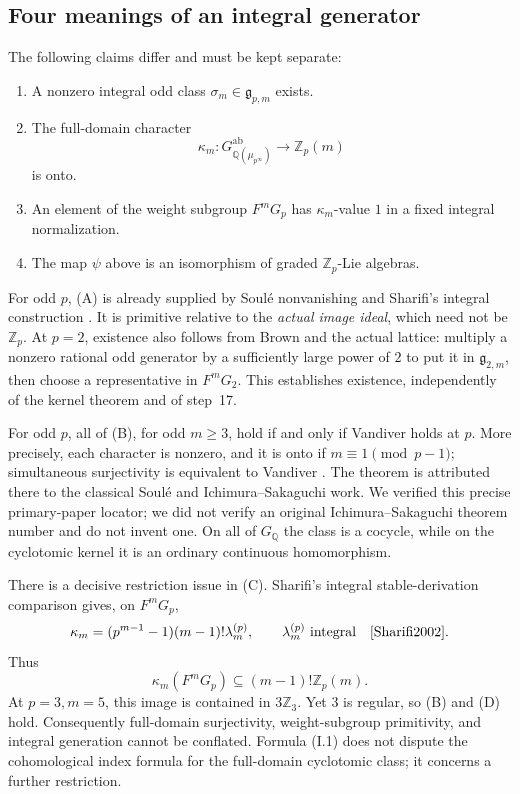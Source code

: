 \subsection{Four meanings of an integral generator}
\label{sec:four-integral-meanings}

The following claims differ and must be kept separate:
\begin{enumerate}
\item[(A)] A nonzero integral odd class $\sigma_m\in\mathfrak g_{p,m}$ exists.
\item[(B)] The full-domain character
\[
 \kappa_m:G_{\mathbb Q(\mu_{p^\infty})}^{\mathrm{ab}}
       \longrightarrow\mathbb Z_p(m)
\]
is onto.
\item[(C)] An element of the weight subgroup $F^mG_p$ has $\kappa_m$-value $1$ in a fixed integral normalization.
\item[(D)] The map $\psi$ above is an isomorphism of graded $\mathbb Z_p$-Lie algebras.
\end{enumerate}

For odd $p$, (A) is already supplied by Soul\'e nonvanishing and Sharifi's integral construction \cite[Proposition~2.3, pp.~5--6]{Sharifi2002}. It is primitive relative to the \emph{actual image ideal}, which need not be $\mathbb Z_p$. At $p=2$, existence also follows from Brown and the actual lattice: multiply a nonzero rational odd generator by a sufficiently large power of $2$ to put it in $\mathfrak g_{2,m}$, then choose a representative in $F^mG_2$. This establishes existence, independently of the kernel theorem and of step~17.

For odd $p$, all of (B), for odd $m\geq3$, hold if and only if Vandiver holds at $p$. More precisely, each character is nonzero, and it is onto if $m\equiv1\pmod{p-1}$; simultaneous surjectivity is equivalent to Vandiver \cite[Theorem~1.1(1)--(3), p.~2]{IshiiKummer2024}. The theorem is attributed there to the classical Soul\'e and Ichimura--Sakaguchi work. We verified this precise primary-paper locator; we did not verify an original Ichimura--Sakaguchi theorem number and do not invent one. On all of $G_{\mathbb Q}$ the class is a cocycle, while on the cyclotomic kernel it is an ordinary continuous homomorphism.

There is a decisive restriction issue in (C). Sharifi's integral stable-derivation comparison gives, on $F^mG_p$,
\[
 \kappa_m=(p^{m-1}-1)(m-1)!\lambda_m^{(p)},
 \qquad \lambda_m^{(p)}\text{ integral}
 \quad\cite[(2.10), p.~7]{Sharifi2002}.
\]
Thus
\[
 \kappa_m(F^mG_p)\subseteq(m-1)!\mathbb Z_p(m).              \tag{I.1}
\]
At $p=3,m=5$, this image is contained in $3\mathbb Z_3$. Yet $3$ is regular, so (B) and (D) hold. Consequently full-domain surjectivity, weight-subgroup primitivity, and integral generation cannot be conflated. Formula (I.1) does not dispute the cohomological index formula for the full-domain cyclotomic class; it concerns a further restriction.

